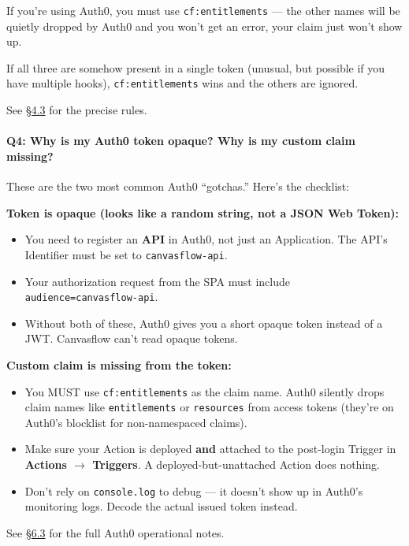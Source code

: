 If you're using Auth0, you must use \texttt{cf:entitlements} --- the other names will be
quietly dropped by Auth0 and you won't get an error, your claim just won't show up.

If all three are somehow present in a single token (unusual, but possible if you have
multiple hooks), \texttt{cf:entitlements} wins and the others are ignored.

See \hyperref[sec:claim-name-hierarchy]{\S4.3} for the precise rules.

\paragraph{Q4: Why is my Auth0 token opaque? Why is my custom claim missing?}

These are the two most common Auth0 ``gotchas.'' Here's the checklist:

\textbf{Token is opaque (looks like a random string, not a JSON Web Token):}
\begin{itemize}
  \item You need to register an \textbf{API} in Auth0, not just an Application. The
    API's Identifier must be set to \texttt{canvasflow-api}.
  \item Your authorization request from the SPA must include
    \texttt{audience=canvasflow-api}.
  \item Without both of these, Auth0 gives you a short opaque token instead of a JWT.
    Canvasflow can't read opaque tokens.
\end{itemize}

\textbf{Custom claim is missing from the token:}
\begin{itemize}
  \item You MUST use \texttt{cf:entitlements} as the claim name. Auth0 silently drops
    claim names like \texttt{entitlements} or \texttt{resources} from access tokens
    (they're on Auth0's blocklist for non-namespaced claims).
  \item Make sure your Action is deployed \textbf{and} attached to the post-login
    Trigger in \textbf{Actions $\to$ Triggers}. A deployed-but-unattached Action does
    nothing.
  \item Don't rely on \texttt{console.log} to debug --- it doesn't show up in Auth0's
    monitoring logs. Decode the actual issued token instead.
\end{itemize}

See \hyperref[sec:auth0-notes]{\S6.3} for the full Auth0 operational notes.

